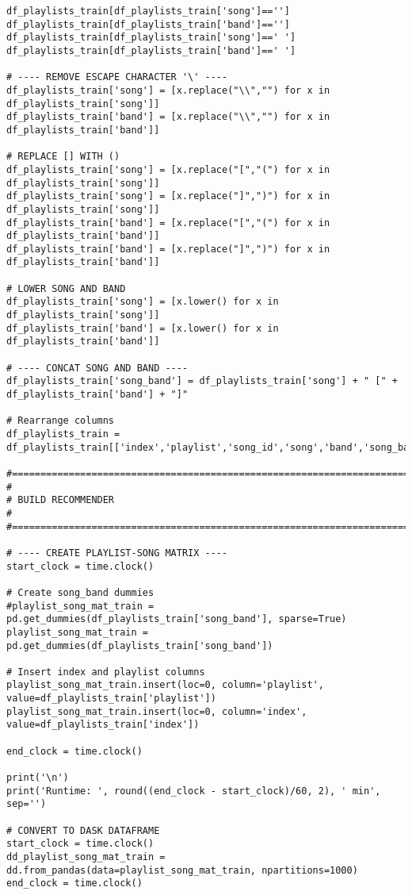 \documentclass[11pt]{article}
\begin{document}
\begin{verbatim}
df_playlists_train[df_playlists_train['song']=='']
df_playlists_train[df_playlists_train['band']=='']
df_playlists_train[df_playlists_train['song']==' ']
df_playlists_train[df_playlists_train['band']==' ']

# ---- REMOVE ESCAPE CHARACTER '\' ----
df_playlists_train['song'] = [x.replace("\\","") for x in df_playlists_train['song']]
df_playlists_train['band'] = [x.replace("\\","") for x in df_playlists_train['band']]

# REPLACE [] WITH ()
df_playlists_train['song'] = [x.replace("[","(") for x in df_playlists_train['song']]
df_playlists_train['song'] = [x.replace("]",")") for x in df_playlists_train['song']]
df_playlists_train['band'] = [x.replace("[","(") for x in df_playlists_train['band']]
df_playlists_train['band'] = [x.replace("]",")") for x in df_playlists_train['band']]

# LOWER SONG AND BAND
df_playlists_train['song'] = [x.lower() for x in df_playlists_train['song']]
df_playlists_train['band'] = [x.lower() for x in df_playlists_train['band']]

# ---- CONCAT SONG AND BAND ----
df_playlists_train['song_band'] = df_playlists_train['song'] + " [" + df_playlists_train['band'] + "]"

# Rearrange columns
df_playlists_train = df_playlists_train[['index','playlist','song_id','song','band','song_band','count']]

#==============================================================================
#
# BUILD RECOMMENDER
#
#==============================================================================

# ---- CREATE PLAYLIST-SONG MATRIX ----
start_clock = time.clock()

# Create song_band dummies
#playlist_song_mat_train = pd.get_dummies(df_playlists_train['song_band'], sparse=True)
playlist_song_mat_train = pd.get_dummies(df_playlists_train['song_band'])

# Insert index and playlist columns
playlist_song_mat_train.insert(loc=0, column='playlist', value=df_playlists_train['playlist'])
playlist_song_mat_train.insert(loc=0, column='index', value=df_playlists_train['index'])

end_clock = time.clock()
    
print('\n')
print('Runtime: ', round((end_clock - start_clock)/60, 2), ' min', sep='')

# CONVERT TO DASK DATAFRAME 
start_clock = time.clock()
dd_playlist_song_mat_train = dd.from_pandas(data=playlist_song_mat_train, npartitions=1000)
end_clock = time.clock()


\end{verbatim}
\end{document}

